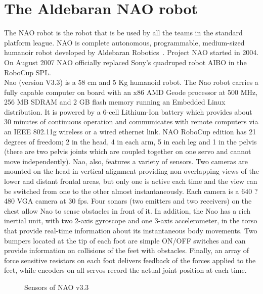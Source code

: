 \section{The Aldebaran NAO robot}
The NAO robot is the robot that is be used by all the teams in the standard platform league. NAO is complete autonomous, programmable, medium-sized humanoir robot developed by Aldebaran Robotics~\cite{naopaper}. Project NAO started in 2004. On August 2007 NAO officially replaced Sony's quadruped robot AIBO in the RoboCup SPL.\\
Nao (version V3.3) is a 58 cm and 5 Kg humanoid robot. The Nao robot carries a fully capable computer on board with an x86 AMD Geode processor at 500 MHz, 256 MB SDRAM and 2 GB flash memory running an Embedded Linux distribution. It is powered by a 6-cell Lithium-Ion battery which provides about 30 minutes of continuous operation and communicates with remote computers via an IEEE 802.11g wireless or a wired ethernet link. NAO RoboCup edition has 21 degrees of freedom; 2 in the head, 4 in each arm, 5 in each leg and 1 in the pelvis (there are two pelvis joints which are coupled together on one servo and cannot move independently). Nao, also, features a variety of sensors. Two cameras are mounted on the head in vertical alignment providing non-overlapping views of the lower and distant frontal areas, but only one is active each time and the view can be switched from one to the other almost instantaneously. Each camera is a 640 ? 480 VGA camera at 30 fps. Four sonars (two emitters and two receivers) on the chest allow Nao to sense obstacles in front of it. In addition, the Nao has a rich inertial unit, with two 2-axis gyroscope and one 3-axis accelerometer, in the torso that provide real-time information about its instantaneous body movements. Two bumpers located at the tip of each foot are simple ON/OFF switches and can provide information on collisions of the feet with obstacles. Finally, an array of force sensitive resistors on each foot delivers feedback of the forces applied to the feet, while encoders on all servos record the actual joint position at each time.
\begin{figure}[h]
	\begin{center}
 		\caption{Sensors of NAO v3.3}
 		\label{fig:sensors}
	\end{center}
\end{figure}

